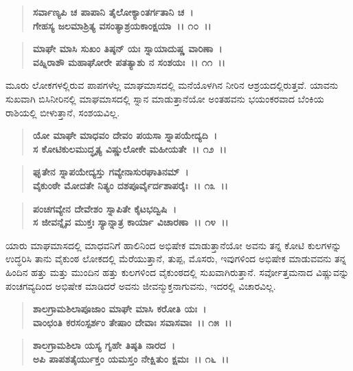 \begin{verse}
\textbf{ಸರ್ವಾಣ್ಯಪಿ ಚ ಪಾಪಾನಿ ತೈಲೋಕ್ಯಾಂತರ್ಗತಾನಿ ಚ~।}\\\textbf{ಗೇಹಸ್ಯ ಜಲಮಾಶ್ರಿತ್ಯ ವಸಂತ್ಯಾಶ್ರಯಕಾಂಕ್ಷಯಾ~।। ೧೦~।।}
\end{verse}

\begin{verse}
\textbf{ಮಾಘೇ ಮಾಸಿ ಸುಖಂ ತಿಷ್ಠನ್ ಯಃ ಸ್ನಾಯಾದುಷ್ಣ ವಾರಿಣಾ~।}\\\textbf{ವಹ್ನಿರಾಶೌ ಮಹಾಘೋರೇ ಪತತ್ಯಾಶು ನ ಸಂಶಯಃ~।। ೧೧~।।}
\end{verse}

ಮೂರು ಲೋಕಗಳಲ್ಲಿರುವ ಪಾಪಗಳೆಲ್ಲ ಮಾಘಮಾಸದಲ್ಲಿ ಮನೆಯೊಳಗಿನ ನೀರಿನ ಆಶ್ರಯದಲ್ಲಿರುತ್ತವೆ. ಯಾವನು ಸುಖವಾಗಿ ಬಿಸಿನೀರಿನಲ್ಲಿ ಮಾಘಮಾಸದಲ್ಲಿ ಸ್ನಾನ ಮಾಡುತ್ತಾನೆಯೋ ಅಂತಹವನು ಭಯಂಕರವಾದ ಬೆಂಕಿಯ ರಾಶಿಯಲ್ಲಿ ಬೀಳುತ್ತಾನೆ, ಸಂಶಯವಿಲ್ಲ.

\begin{verse}
\textbf{ಯೋ ಮಾಘೇ ಮಾಧವಂ ದೇವಂ ಪಯಸಾ ಸ್ನಾಪಯೇದ್ಯದಿ~।}\\\textbf{ಸ ಕೋಟಿಕುಲಮುದ್ಧೃತ್ಯ ವಿಷ್ಣುಲೋಕೇ ಮಹೀಯತೇ~।। ೧೨~।। }
\end{verse}

\begin{verse}
\textbf{ಘೃತೇನ ಸ್ನಾಪಯೇದ್ಯಸ್ತು ಗವ್ಯೇನಾಸುರಘಾತಿನಮ್~।}\\\textbf{ವೈಕುಂಠೇ ಮೋದತೇ ನಿತ್ಯಂ ದಶಪೂರ್ವೈರ್ದಶಾಪರೈಃ~।। ೧೩~।।}
\end{verse}

\begin{verse}
\textbf{ಪಂಚಗವ್ಯೇನ ದೇವೇಶಂ ಸ್ನಾಪಿತೇ ಕೈಟಭದ್ವಿಷಿ~।}\\\textbf{ಸ ಜೀವನ್ನೈವ ಮುಕ್ತಃ ಸ್ಯಾನ್ನಾತ್ರ ಕಾರ್ಯಾ ವಿಚಾರಣಾ~।। ೧೪~।।}
\end{verse}

ಯಾರು ಮಾಘಮಾಸದಲ್ಲಿ ಮಾಧವನಿಗೆ ಹಾಲಿನಿಂದ ಅಭಿಷೇಕ ಮಾಡುತ್ತಾನೆಯೋ ಅವನು ತನ್ನ ಕೋಟಿ ಕುಲಗಳನ್ನು ಉದ್ಧರಿಸಿ ತಾನು ವೈಕುಂಠ ಲೋಕದಲ್ಲಿ ಮೆರೆಯುತ್ತಾನೆ, ತುಪ್ಪ, ಮೊಸರು, ಇವುಗಳಿಂದ ಅಭಿಷೇಕ ಮಾಡುವವನು ತನ್ನ ಹಿಂದಿನ ಹತ್ತು ಮತ್ತು ಮುಂದಿನ ಹತ್ತು ಕುಲಗಳಿಂದ ವೈಕುಂಠದಲ್ಲಿ ಸುಖವಾಗಿರುತ್ತಾನೆ. ಸರ್ವೋತ್ತಮನಾದ ವಿಷ್ಣುವನ್ನು ಪಂಚಗವ್ಯದಿಂದ ಅಭಿಷೇಕ ಮಾಡಿದರೆ ಅವನು ಜೀವನ್ಮುಕ್ತನಾಗುವನು, ಇದರಲ್ಲಿ ವಿಚಾರವಿಲ್ಲ.

\begin{verse}
\textbf{ಶಾಲಗ್ರಾಮಶಿಲಾಪೂಜಾಂ ಮಾಘೇ ಮಾಸಿ ಕರೋತಿ ಯಃ~।}\\\textbf{ವಾಂಛಂತಿ ಕರಸಂಸ್ಪರ್ಶಂ ತೇಷಾಂ ದೇವಾಃ ಸವಾಸವಾಃ~।। ೧೫~।। }
\end{verse}

\begin{verse}
\textbf{ಶಾಲಗ್ರಾಮಶಿಲಾ ಯಸ್ಯ ಗೃಹೇ ತಿಷ್ಠತಿ ನಾರದ~।}\\\textbf{ಅಪಿ ಪಾಪಶತೈರ್ಯುಕ್ತಂ ಯಮಸ್ತಂ ನೇಕ್ಷಿತುಂ ಕ್ಷಮಃ~।। ೧೬~।।} 
\end{verse}

